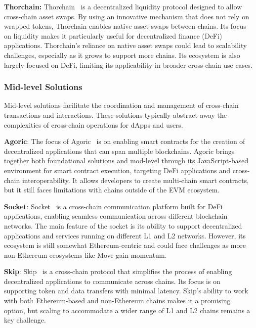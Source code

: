 \textbf{Thorchain:} Thorchain~\cite{thorchain} is a decentralized liquidity protocol designed to allow cross-chain asset swaps. By using an innovative mechanism that does not rely on wrapped tokens, Thorchain enables native asset swaps between chains. Its focus on liquidity makes it particularly useful for decentralized finance (DeFi) applications. Thorchain’s reliance on native asset swaps could lead to scalability challenges, especially as it grows to support more chains. Its ecosystem is also largely focused on DeFi, limiting its applicability in broader cross-chain use cases.


\subsubsection{Mid-level Solutions}

Mid-level solutions facilitate the coordination and management of cross-chain transactions and interactions. These solutions typically abstract away the complexities of cross-chain operations for dApps and users.

\textbf{Agoric}: The focus of Agoric~\cite{agoric} is on enabling smart contracts for the creation of decentralized applications that can span multiple blockchains. Agoric brings together both foundational solutions and mod-level through its JavaScript-based environment for smart contract execution, targeting DeFi applications and cross-chain interoperability. It allows developers to create multi-chain smart contracts, but it still faces limitations with chains outside of the EVM ecosystem.

\textbf{Socket}: Socket~\cite{socket} is a cross-chain communication platform built for DeFi applications, enabling seamless communication across different blockchain networks. The main feature of the socket is its ability to support decentralized applications and services running on different L1 and L2 networks. However, its ecosystem is still somewhat Ethereum-centric and could face challenges as more non-Ethereum ecosystems like Move gain momentum.

\textbf{Skip}: Skip~\cite{skip} is a cross-chain protocol that simplifies the process of enabling decentralized applications to communicate across chains. Its focus is on supporting token and data transfers with minimal latency. Skip’s ability to work with both Ethereum-based and non-Ethereum chains makes it a promising option, but scaling to accommodate a wider range of L1 and L2 chains remains a key challenge.

